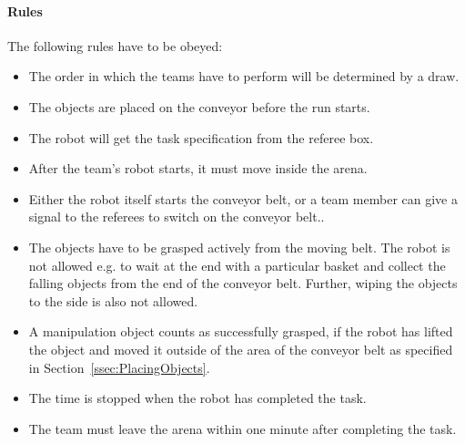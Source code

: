 \paragraph{Rules}
The following rules have to be obeyed:

\begin{itemize}
\item The order in which the teams have to perform will be determined by a draw.
\item The objects are placed on the conveyor before the run starts.
\item The robot will get the task specification from the referee box.
\item After the team's robot starts, it must move inside the arena.
\item Either the robot itself starts the conveyor belt, or a team member can give a signal to the referees to switch on the conveyor belt..
\item The objects have to be grasped actively from the moving belt. The robot is not allowed e.g. to wait at the end with a particular basket and collect the falling objects from the end of the conveyor belt. Further, wiping the objects to the side is also not allowed.
\item A manipulation object counts as successfully grasped, if the robot has lifted the object and moved it outside of the area of the conveyor belt as specified in Section~\ref{ssec:PlacingObjects}.
\item {} The time is stopped when the robot has completed the task.
\item The team must leave the arena within one minute after completing the task.
\end{itemize}



%
%
